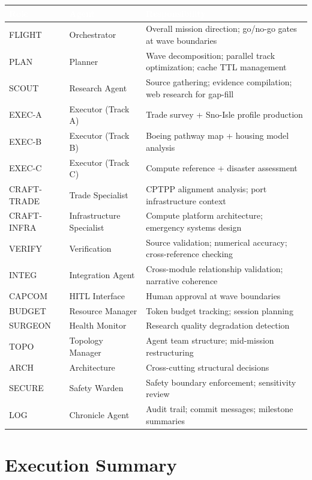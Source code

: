\documentclass[11pt,letterpaper]{article}
\newcommand{\tableheader}[1]{\textbf{\sffamily\textcolor{white}{#1}}}
\begin{document}
\begin{center}
\begin{tabularx}{\textwidth}{L{1.8cm}L{2.5cm}X}
\toprule
{}
\tableheader{Role} & \tableheader{Agent} & \tableheader{Responsibility} \\
\midrule
FLIGHT & Orchestrator & Overall mission direction; go/no-go gates at wave boundaries \\
PLAN & Planner & Wave decomposition; parallel track optimization; cache TTL management \\
SCOUT & Research Agent & Source gathering; evidence compilation; web research for gap-fill \\
EXEC-A & Executor (Track A) & Trade survey + Sno-Isle profile production \\
EXEC-B & Executor (Track B) & Boeing pathway map + housing model analysis \\
EXEC-C & Executor (Track C) & Compute reference + disaster assessment \\
CRAFT-TRADE & Trade Specialist & CPTPP alignment analysis; port infrastructure context \\
CRAFT-INFRA & Infrastructure Specialist & Compute platform architecture; emergency systems design \\
VERIFY & Verification & Source validation; numerical accuracy; cross-reference checking \\
INTEG & Integration Agent & Cross-module relationship validation; narrative coherence \\
CAPCOM & HITL Interface & Human approval at wave boundaries \\
BUDGET & Resource Manager & Token budget tracking; session planning \\
SURGEON & Health Monitor & Research quality degradation detection \\
TOPO & Topology Manager & Agent team structure; mid-mission restructuring \\
ARCH & Architecture & Cross-cutting structural decisions \\
SECURE & Safety Warden & Safety boundary enforcement; sensitivity review \\
LOG & Chronicle Agent & Audit trail; commit messages; milestone summaries \\
\bottomrule
\end{tabularx}
\end{center}

\section{Execution Summary}
\end{document}
